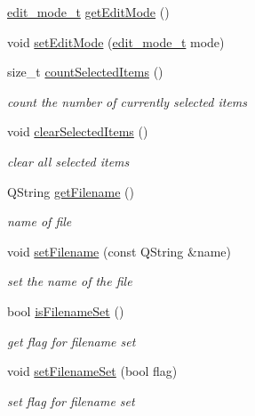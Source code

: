 \begin{DoxyCompactItemize}
\item 
\hyperlink{namespaceShipCAD_a66144e3f3a53da01f51c9bdb94fcae31}{edit\-\_\-mode\-\_\-t} \hyperlink{classShipCAD_1_1ShipCADModel_a355525c21cd0a9a4a88846b5587a236c}{get\-Edit\-Mode} ()
\item 
void \hyperlink{classShipCAD_1_1ShipCADModel_a2636160d900b8d8b00802ae78ee87925}{set\-Edit\-Mode} (\hyperlink{namespaceShipCAD_a66144e3f3a53da01f51c9bdb94fcae31}{edit\-\_\-mode\-\_\-t} mode)
\item 
size\-\_\-t \hyperlink{classShipCAD_1_1ShipCADModel_ac01e316c15b67f35e5db96aa186d362e}{count\-Selected\-Items} ()
\begin{DoxyCompactList}\small\item\em count the number of currently selected items \end{DoxyCompactList}\item 
void \hyperlink{classShipCAD_1_1ShipCADModel_a690bd5621d82d15a28ea59c09ded99d8}{clear\-Selected\-Items} ()
\begin{DoxyCompactList}\small\item\em clear all selected items \end{DoxyCompactList}\item 
Q\-String \hyperlink{classShipCAD_1_1ShipCADModel_a7cdd359f050f81975d1992a7d161ce87}{get\-Filename} ()
\begin{DoxyCompactList}\small\item\em name of file \end{DoxyCompactList}\item 
void \hyperlink{classShipCAD_1_1ShipCADModel_a07daf75d876f80296f841f5c8d2327cb}{set\-Filename} (const Q\-String \&name)
\begin{DoxyCompactList}\small\item\em set the name of the file \end{DoxyCompactList}\item 
bool \hyperlink{classShipCAD_1_1ShipCADModel_af63013461d2ef6ee7221d72a42949d7c}{is\-Filename\-Set} ()
\begin{DoxyCompactList}\small\item\em get flag for filename set \end{DoxyCompactList}\item 
void \hyperlink{classShipCAD_1_1ShipCADModel_a960f3e97ef2aa847c9bb7cdc7731cd39}{set\-Filename\-Set} (bool flag)
\begin{DoxyCompactList}\small\item\em set flag for filename set \end{DoxyCompactList}\item 

\end{DoxyCompactItemize}
